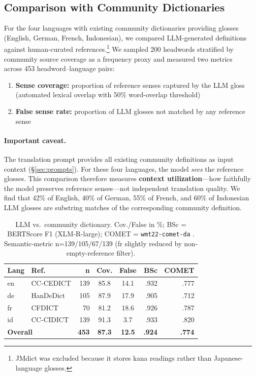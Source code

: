 \documentclass[11pt]{article}
\begin{document}
\subsection{Comparison with Community Dictionaries}
\label{sec:community}

For the four languages with existing community dictionaries providing glosses (English, German, French, Indonesian), we compared LLM-generated definitions against human-curated references.\footnote{JMdict was excluded because it stores kana readings rather than Japanese-language glosses.} We sampled 200 headwords stratified by community source coverage as a frequency proxy and measured two metrics across 453 headword--language pairs:

\begin{enumerate}
\item \textbf{Sense coverage:} proportion of reference senses captured by the LLM gloss (automated lexical overlap with 50\% word-overlap threshold)
\item \textbf{False sense rate:} proportion of LLM glosses not matched by any reference sense
\end{enumerate}

\paragraph{Important caveat.} The translation prompt provides all existing community definitions as input context (\S\ref{sec:prompts}). For these four languages, the model \textit{sees} the reference glosses. This comparison therefore measures \textbf{context utilization}---how faithfully the model preserves reference senses---not independent translation quality. We find that 42\% of English, 40\% of German, 55\% of French, and 60\% of Indonesian LLM glosses are substring matches of the corresponding community definition.

\begin{table}[t]
\centering
\small
\setlength{\tabcolsep}{4pt}
\begin{tabular}{llrccrr}
\toprule
\textbf{Lang} & \textbf{Ref.} & \textbf{n} & \textbf{Cov.} & \textbf{False} & \textbf{BSc} & \textbf{COMET} \\
\midrule
en & CC-CEDICT  & 139 & 85.8 & 14.1 & .932 & .777 \\
de & HanDeDict  & 105 & 87.9 & 17.9 & .905 & .712 \\
fr & CFDICT     &  70 & 81.2 & 18.6 & .926 & .787 \\
id & CC-CIDICT  & 139 & 91.3 &  3.7 & .933 & .820 \\
\midrule
\multicolumn{2}{l}{\textbf{Overall}} & \textbf{453} & \textbf{87.3} & \textbf{12.5} & \textbf{.924} & \textbf{.774} \\
\bottomrule
\end{tabular}
\caption{LLM vs.\ community dictionary. Cov./False in \%; BSc = BERTScore F1 (XLM-R-large); COMET = \texttt{wmt22-comet-da} \citep{rei2022comet}. Semantic-metric n=139/105/67/139 (fr slightly reduced by non-empty-reference filter).}
\label{tab:comparison}
\end{table}
\end{document}
